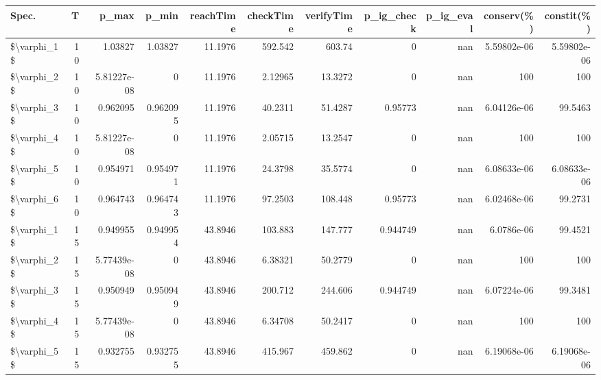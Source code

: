 \begin{tabular}{lrrrrrrrrrr}
\hline
 Spec.       &   T &       p\_max &    p\_min &   reachTime &      checkTime &   verifyTime &   p\_ig\_check &   p\_ig\_eval &    conserv(\%) &    constit(\%) \\
\hline
 \$\textbackslash{}varphi\_1\$ &  10 & 1.03827     & 1.03827  &     11.1976 &  592.542       &     603.74   &     0        &         nan &   5.59802e-06 &   5.59802e-06 \\
 \$\textbackslash{}varphi\_2\$ &  10 & 5.81227e-08 & 0        &     11.1976 &    2.12965     &      13.3272 &     0        &         nan & 100           & 100           \\
 \$\textbackslash{}varphi\_3\$ &  10 & 0.962095    & 0.962095 &     11.1976 &   40.2311      &      51.4287 &     0.95773  &         nan &   6.04126e-06 &  99.5463      \\
 \$\textbackslash{}varphi\_4\$ &  10 & 5.81227e-08 & 0        &     11.1976 &    2.05715     &      13.2547 &     0        &         nan & 100           & 100           \\
 \$\textbackslash{}varphi\_5\$ &  10 & 0.954971    & 0.954971 &     11.1976 &   24.3798      &      35.5774 &     0        &         nan &   6.08633e-06 &   6.08633e-06 \\
 \$\textbackslash{}varphi\_6\$ &  10 & 0.964743    & 0.964743 &     11.1976 &   97.2503      &     108.448  &     0.95773  &         nan &   6.02468e-06 &  99.2731      \\
 \$\textbackslash{}varphi\_1\$ &  15 & 0.949955    & 0.949954 &     43.8946 &  103.883       &     147.777  &     0.944749 &         nan &   6.0786e-06  &  99.4521      \\
 \$\textbackslash{}varphi\_2\$ &  15 & 5.77439e-08 & 0        &     43.8946 &    6.38321     &      50.2779 &     0        &         nan & 100           & 100           \\
 \$\textbackslash{}varphi\_3\$ &  15 & 0.950949    & 0.950949 &     43.8946 &  200.712       &     244.606  &     0.944749 &         nan &   6.07224e-06 &  99.3481      \\
 \$\textbackslash{}varphi\_4\$ &  15 & 5.77439e-08 & 0        &     43.8946 &    6.34708     &      50.2417 &     0        &         nan & 100           & 100           \\
 \$\textbackslash{}varphi\_5\$ &  15 & 0.932755    & 0.932755 &     43.8946 &  415.967       &     459.862  &     0        &         nan &   6.19068e-06 &   6.19068e-06 \\

\end{tabular}
